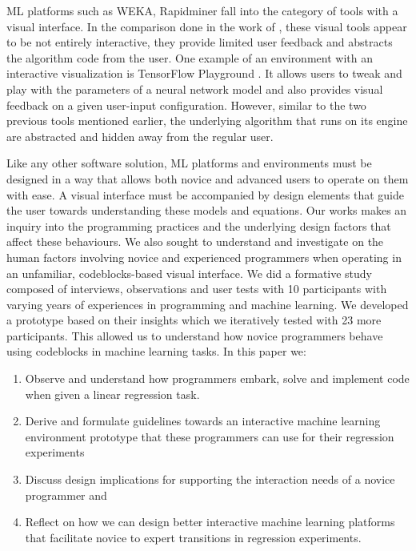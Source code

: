 \documentclass{sigchi}
\begin{document}
ML platforms such as WEKA, Rapidminer fall into the category of tools with a visual interface. In the comparison done in the work of \cite{nodalo2019building}, these visual tools appear to be not entirely interactive, they provide limited user feedback and abstracts the algorithm code from the user. One example of an environment with an interactive visualization is TensorFlow Playground \cite{smilkov2017neural}. It allows users to tweak and play with the parameters of a neural network model and also provides visual feedback on a given user-input configuration. However, similar to the two previous tools mentioned earlier, the underlying algorithm that runs on its engine are abstracted and hidden away from the regular user. 

Like any other software solution, ML platforms and environments must be designed in a way that allows both novice and advanced users to operate on them with ease. A visual interface must be accompanied by design elements that guide the user towards understanding these models and equations. Our works makes an inquiry into the programming practices and the underlying design factors that affect these behaviours. We also sought to understand and investigate on the human factors involving novice and experienced programmers when operating in an unfamiliar, codeblocks-based visual interface. We did a formative study composed of interviews, observations and user tests with 10 participants with varying years of experiences in programming and machine learning. We developed a prototype based on their insights which we iteratively tested with 23 more participants. This allowed us to understand how novice programmers behave using codeblocks in machine learning tasks. In this paper we: 
\begin{enumerate}
    \item Observe and understand how programmers embark, solve and implement code when given a linear regression task. 
    \item Derive and formulate guidelines towards an interactive machine learning environment prototype that these programmers can use for their regression experiments 
    \item Discuss design implications for supporting the interaction needs of a novice programmer and 
    \item Reflect on how we can design better interactive machine learning platforms that facilitate novice to expert transitions in regression experiments. 
\end{enumerate}
\end{document}
